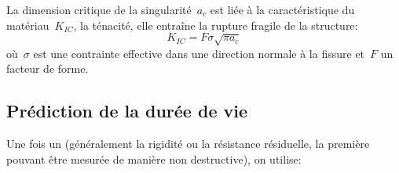 La dimension critique de la singularité~$a_c$ est liée à la caractéristique du matériau~$K_{IC}$,
la ténacité, elle entraîne la rupture fragile de la structure:
\begin{equation} K_{IC} = F \sigma \sqrt{\pi a_c} \end{equation}
où~$\sigma$ est une contrainte effective dans une direction normale à la fissure et~$F$ un
facteur de forme.




\medskip
\subsection{Prédiction de la durée de vie}

Une fois un  (généralement la rigidité ou la
résistance résiduelle, la première pouvant être mesurée de manière non
destructive), on utilise:
